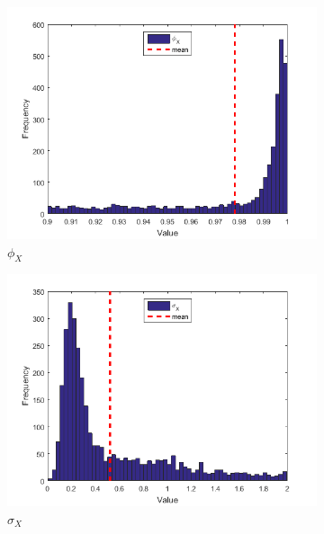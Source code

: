 \documentclass[11pt,a4,twosided,singlespacing,titlepagenumber=on]{scrreprt}
\numberwithin{equation}{chapter} %
\theoremstyle{remark}
\begin{document}
\begin{figure}[H]
    \centering
    \begin{subfigure}[t]{0.32\textwidth}
        \centering
        \includegraphics[width=1\textwidth]{res/params/3653_4384/1}
        \caption{$\phi_X$}
    \end{subfigure}
    \begin{subfigure}[t]{0.32\textwidth}
        \centering
        \includegraphics[width=1\textwidth]{res/params/3653_4384/2}
        \caption{$\sigma_X$}
    \end{subfigure}
    \begin{subfigure}[t]{0.32\textwidth}
        \centering

\end{subfigure}
\end{figure}
\end{document}
